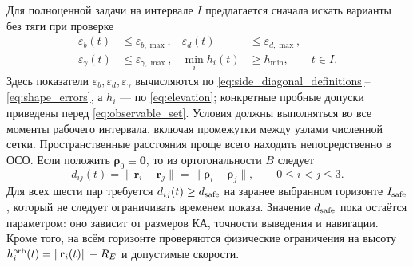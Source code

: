 \documentclass[a4paper,12pt]{article}
\begin{document}
Для полноценной задачи на интервале $I$ предлагается сначала искать варианты без тяги при проверке
\begin{equation}
    \begin{aligned}
        \varepsilon_b(t)&\leq\varepsilon_{b,\max},
        &\varepsilon_d(t)&\leq\varepsilon_{d,\max},\\
        \varepsilon_\gamma(t)&\leq\varepsilon_{\gamma,\max},
        &\min_i h_i(t)&\geq h_{\min},\qquad t\in I.
    \end{aligned}
    \label{eq:observation_criteria}
\end{equation}
Здесь показатели $\varepsilon_b,\varepsilon_d,\varepsilon_\gamma$ вычисляются
по \eqref{eq:side_diagonal_definitions}--\eqref{eq:shape_errors},
а $h_i$ --- по \eqref{eq:elevation}; конкретные пробные допуски
приведены перед \eqref{eq:observable_set}. Условия должны выполняться
во все моменты рабочего интервала, включая промежутки между узлами
численной сетки. Пространственные расстояния проще всего находить
непосредственно в ОСО. Если положить
$\boldsymbol\rho_0\equiv\mathbf0$, то из ортогональности $B$ следует
\begin{equation}
 d_{ij}(t)=\|\mathbf r_i-\mathbf r_j\|
           =\|\boldsymbol\rho_i-\boldsymbol\rho_j\|,
 \qquad 0\leq i<j\leq3.
 \label{eq:pairwise_distances}
\end{equation}
Для всех шести пар требуется
$d_{ij}(t)\geq d_{\rm safe}$ на заранее выбранном горизонте
$I_{\rm safe}$, который не следует ограничивать временем показа.
Значение $d_{\rm safe}$ пока остаётся параметром: оно зависит
от размеров КА, точности выведения и навигации. Кроме того,
на всём горизонте проверяются физические ограничения на высоту
$h_i^{\rm orb}(t)=\|\mathbf r_i(t)\|-R_E$ и допустимые скорости.
\end{document}

